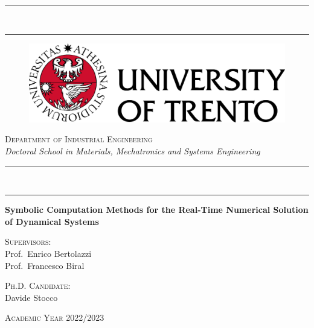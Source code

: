 
\begin{titlepage}
%
\setlength\parindent{0pt}
\setlength{\topmargin}{-20mm}
\setlength{\voffset}{0mm}
%
\begin{center}
  \rule[0.1cm]{\textwidth}{0.6mm} \\ %
  \rule[0.5cm]{\textwidth}{0.3mm}
\end{center}
%
\vspace{-5mm}
%
\begin{figure}[h]
  \centering
  \includegraphics[scale=0.5]{./figures/frontmatter/logo.png}
\end{figure}
%
\begin{center}
  \Large{\textsc{Department of Industrial Engineering}} \\
  \vspace{2mm}
  \large{\textsl{Doctoral School in Materials, Mechatronics and Systems Engineering}} \\
\end{center}
%
\begin{center}
  \rule[0.1cm]{\textwidth}{0.3mm} \\ %
  \rule[0.5cm]{\textwidth}{0.6mm}
\end{center}
%
\vfill
%
\begin{center}
  \LARGE{\textbf{Symbolic Computation Methods for the Real-Time Numerical Solution of Dynamical Systems}} \\
\end{center}
%
\vfill
%
\begin{minipage}[t]{0.49\textwidth}
  \large{\textsc{Supervisors:}} \\
  Prof.~Enrico Bertolazzi \\[0.05em]
  Prof.~Francesco Biral
\end{minipage}
\hfill
\begin{minipage}[t]{0.49\textwidth}\raggedleft
  \large{\textsc{Ph.D. Candidate:}} \\
  Davide Stocco
  \vspace{5mm}
\end{minipage}
%
\vfill
%
\begin{center}
  \large{\textsc{Academic Year 2022/2023}}
\end{center}

\end{titlepage}
